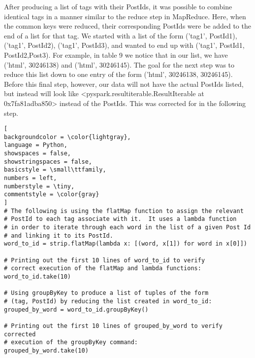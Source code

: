 \documentclass[]{article}
\begin{document}
After producing a list of tags with their PostIds, it was possible to combine identical tags in a manner similar to the reduce step in MapReduce.  Here, when the common keys were reduced, their corresponding PostIds were be added to the end of a list for that tag. We started with a list of the form ('tag1', PostId1), ('tag1', PostId2), ('tag1', PostId3), and wanted to end up with ('tag1', PostId1, PostId2,Post3).  For example, in table 9 we notice that in our list, we have ('html', 30246138) and ('html', 30246145).  The goal for the next step was to reduce this list down to one entry of the form ('html', 30246138, 30246145).  Before this final step, however, our data will not have the actual PostIds listed, but instead will look like  <pyspark.resultiterable.ResultIterable at 0x7fa81adba850> instead of the PostIds.  This was corrected for in the following step.
\begin{lstlisting}[
backgroundcolor = \color{lightgray},
language = Python,
showspaces = false,
showstringspaces = false,
basicstyle = \small\ttfamily,
numbers = left,
numberstyle = \tiny,
commentstyle = \color{gray}
]
# The following is using the flatMap function to assign the relevant 
# PostId to each tag associate with it.  It uses a lambda function 
# in order to iterate through each word in the list of a given Post Id
# and linking it to its PostId.
word_to_id = strip.flatMap(lambda x: [(word, x[1]) for word in x[0]])

# Printing out the first 10 lines of word_to_id to verify
# correct execution of the flatMap and lambda functions:
word_to_id.take(10)

# Using groupByKey to produce a list of tuples of the form 
# (tag, PostId) by reducing the list created in word_to_id:
grouped_by_word = word_to_id.groupByKey()

# Printing out the first 10 lines of grouped_by_word to verify corrected
# execution of the groupByKey command:
grouped_by_word.take(10)

\end{lstlisting}
\pagebreak
\end{document}
